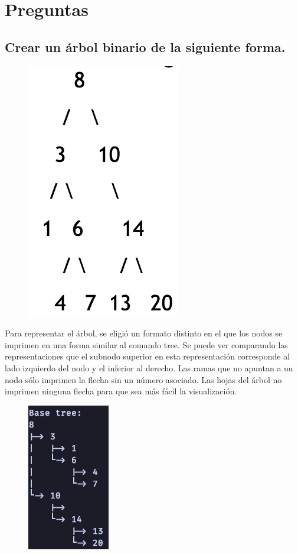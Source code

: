 \documentclass[a4paper,notitlepage]{article}
\begin{document}
\pagebreak

\section{Preguntas}
\subsection{Crear un árbol binario de la siguiente forma.}
\begin{figure}[H]
    \centering
    \includegraphics[scale=0.65]{imgs/base-tree.png}
\end{figure}

Para representar el árbol, se eligió un formato distinto en el que los nodos
se imprimen en una forma similar al comando tree. Se puede ver comparando las
representaciones que el subnodo superior en esta representación corresponde
al lado izquierdo del nodo y el inferior al derecho. Las ramas que no apuntan
a un nodo sólo imprimen la flecha sin un número asociado. Las hojas del árbol
no imprimen ninguna flecha para que sea más fácil la visualización.

\begin{figure}[H]
    \centering
    \includegraphics[scale=0.65]{imgs/base-tree-run.png}
\end{figure}
\end{document}
